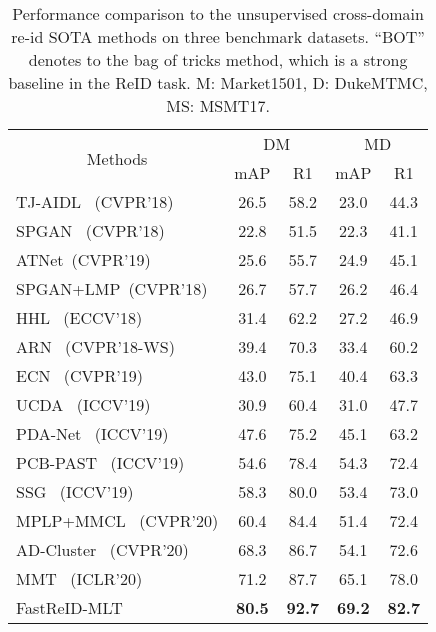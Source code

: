 \documentclass[10pt,twocolumn,letterpaper]{article}
\begin{document}
\begin{table}[t]
        
\fontsize{8}{8}\selectfont
\centering
\caption{Performance comparison to the unsupervised cross-domain re-id SOTA methods on three benchmark datasets. ``BOT'' denotes to the bag of tricks method, which is a strong baseline in the ReID task. M: Market1501, D: DukeMTMC, MS: MSMT17.}
\vspace{-0.5em}
        \begin{center}
            \begin{tabular}{|l|cc|cc|}
                \hline
                \multicolumn{1}{|c|}{\multirow{2}{*}{Methods}} & \multicolumn{2}{c|}{\scriptsize{DM}} & \multicolumn{2}{c|}{MD} \\
                \cline{2-5}
                \multicolumn{1}{|c|}{} & mAP & R1  & mAP & R1  \\ 
                \hline 
                TJ-AIDL~\cite{wang2018transferable} (CVPR'18) & 26.5 & 58.2  & 23.0 & 44.3  \\
                SPGAN~\cite{deng2018image} (CVPR'18) & 22.8 & 51.5  & 22.3 & 41.1  \\
                ATNet~\cite{Liu2019cvpr}(CVPR'19) & 25.6& 55.7&  24.9 &45.1 \\
                SPGAN+LMP~\cite{DengWeijian2018cvpr}(CVPR'18) &26.7 &57.7 & 26.2&46.4  \\
                HHL~\cite{zhong2018generalizing} (ECCV'18) & 31.4 & 62.2  & 27.2 & 46.9  \\

                ARN~\cite{li2018adaptation} (CVPR'18-WS) & 39.4 & 70.3 & 33.4 & 60.2  \\
                ECN~\cite{zhong2019invariance} (CVPR'19) & 43.0 & 75.1  & 40.4 & 63.3  \\
                UCDA~\cite{qi2019novel} (ICCV'19) & 30.9 & 60.4  & 31.0 & 47.7  \\
                PDA-Net~\cite{li2019cross} (ICCV'19) & 47.6 & 75.2  & 45.1 & 63.2  \\
                PCB-PAST~\cite{zhang2019self} (ICCV'19) & 54.6 & 78.4  & 54.3 & 72.4  \\
                SSG~\cite{yang2019selfsimilarity} (ICCV'19) & 58.3 & 80.0  & 53.4 & 73.0  \\
                MPLP+MMCL~\cite{WANG2020cvpr1} (CVPR'20) & 60.4 &84.4  & 51.4&72.4   \\ AD-Cluster~\cite{zhai2020adcluster} (CVPR'20)& {68.3} & {86.7}  & {54.1} & {72.6}  \\ 
                MMT~\cite{ge2020mutual} (ICLR'20) & {71.2} & {87.7}  & {65.1} & {78.0}  \\
                \hline
                FastReID-MLT  & \textbf{80.5} & \textbf{92.7} & \textbf{69.2}  & \textbf{82.7}  \\
                

\end{tabular}
\end{center}
\end{table}
\end{document}
